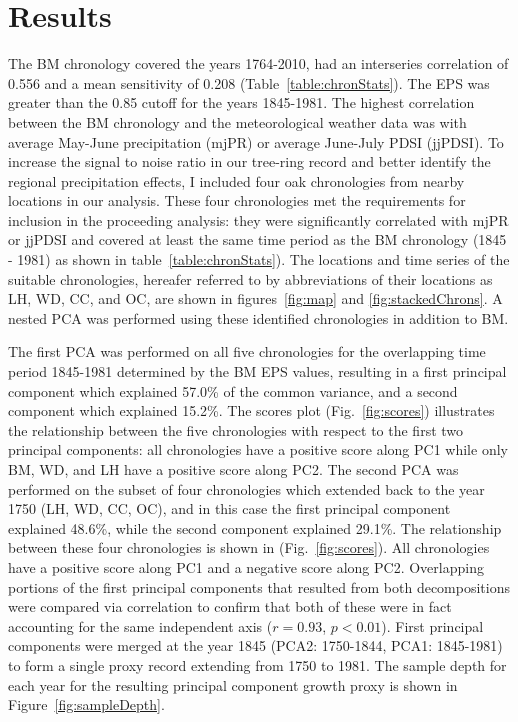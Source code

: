 
\section{Results}

The BM chronology covered the years 1764-2010, had an interseries correlation of 0.556 and a mean sensitivity of 0.208 (Table~\ref{table:chronStats}). The EPS was greater than the 0.85 cutoff for the years 1845-1981. The highest correlation between the BM chronology and the meteorological weather data was with average May-June precipitation (mjPR\label{sym:mjPR}) or average June-July PDSI (jjPDSI\label{sym:jjPDSI}). To increase the signal to noise ratio in our tree-ring record and better identify the regional precipitation effects, I included four oak chronologies from nearby locations in our analysis. These four chronologies met the requirements for inclusion in the proceeding analysis: they were significantly correlated with mjPR\label{sym:mjPR} or jjPDSI\label{sym:jjPDSI} and covered at least the same time period as the BM chronology (1845 - 1981) as shown in table~\ref{table:chronStats}). The locations and time series of the suitable chronologies, hereafer referred to by abbreviations of their locations as LH, WD, CC, and OC,\label{sym:LH}\label{sym:WD}\label{sym:CC}\label{sym:OC} are shown in figures~\ref{fig:map} and \ref{fig:stackedChrons}. A nested PCA was performed using these identified chronologies in addition to BM. 

The first PCA was performed on all five chronologies for the overlapping time period 1845-1981 determined by the BM EPS values, resulting in a first principal component which explained 57.0\% of the common variance, and a second component which explained 15.2\%. The scores plot (Fig.~\ref{fig:scores}) illustrates the relationship between the five chronologies with respect to the first two principal components: all chronologies have a positive score along PC1 while only BM, WD, and LH have a positive score along PC2. The second PCA was performed on the subset of four chronologies which extended back to the year 1750 (LH, WD, CC, OC), and in this case the first principal component explained 48.6\%, while the second component explained 29.1\%. The relationship between these four chronologies is shown in (Fig.~\ref{fig:scores}). All chronologies have a positive score along PC1 and a negative score along PC2. Overlapping portions of the first principal components that resulted from both decompositions were compared via correlation to confirm that both of these were in fact accounting for the same independent axis ($r=0.93$, $p < 0.01$). First principal components were merged at the year 1845 (PCA2: 1750-1844, PCA1: 1845-1981) to form a single proxy record extending from 1750 to 1981. The sample depth for each year for the resulting principal component growth proxy is shown in Figure~\ref{fig:sampleDepth}.


